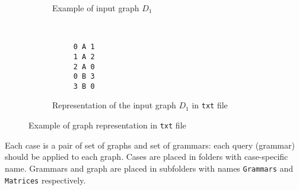 \begin{figure}[h]
    \centering
    \begin{subfigure}[b]{0.24\textwidth}
        \centering

        \caption{Example of input graph $D_1$}
    \end{subfigure}%
    ~ 
    \begin{subfigure}[b]{0.24\textwidth}
        \centering
         \begin{verbatim}
     0 A 1
     1 A 2
     2 A 0
     0 B 3
     3 B 0
 \end{verbatim} 

        \caption{Representation of the input graph $D_1$ in \texttt{txt} file}
    \end{subfigure}
    \caption{Example of graph representation in \texttt{txt} file}
    \label{fig:graph_example}
\end{figure}

Each case is a pair of set of graphs and set of grammars: each query (grammar) should be applied to each graph.
Cases are placed in folders with case-specific name.
Grammars and graph are placed in subfolders with names \verb|Grammars| and \verb|Matrices| respectively.


